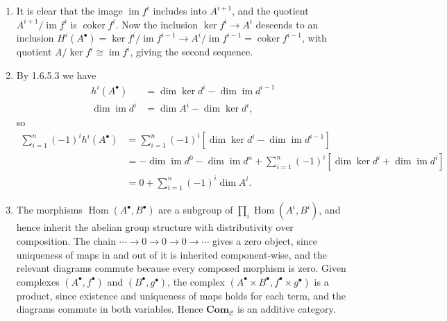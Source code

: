 \documentclass{report}
\newcommand{\cat}[1]{\mathbf{#1}} %
\newcommand{\scrC}{\mathscr{C}}
\DeclareMathOperator{\im}{im}
\DeclareMathOperator{\coker}{coker}
\DeclareMathOperator{\Hom}{Hom}
\begin{document}
\begin{enumerate}[label=\textbf{1.6.\Alph*.}]
	\item It is clear that the image $\im f^i$ includes into $A^{i+1}$, and
	      the quotient $A^{i+1}/\im f^i$ is $\coker f^i$. Now the inclusion
	      $\ker f^i\to A^i$ descends  to an inclusion
	      $H^i(A^\bullet)=\ker f^i/\im f^{i-1}\to A^i/\im f^{i-1}=\coker f^{i-1}$,
	      with quotient $A/\ker f^i\cong\im f^i$, giving the second sequence.

	\item By 1.6.5.3 we have
	      \begin{align*}
		      h^i(A^\bullet) & = \dim\ker d^i - \dim\im d^{i-1} \\
		      \dim\im d^i    & = \dim A^i - \dim\ker d^i,
	      \end{align*}
	      so
	      \begin{align*}
		      \sum_{i=1}^n(-1)^ih^i(A^\bullet)
		       & = \sum_{i=1}^n(-1)^i\left[\dim\ker d^i - \dim\im d^{i-1}\right] \\
		       & = -\dim\im d^0 - \dim\im d^n
		      + \sum_{i=1}^n(-1)^i\left[\dim\ker d^i + \dim\im d^i\right]        \\
		       & = 0 + \sum_{i=1}^n(-1)^i\dim A^i.
	      \end{align*}

	\item The morphisms $\Hom(A^\bullet,B^\bullet)$ are a subgroup of
	      $\prod_i\Hom(A^i,B^i)$, and hence inherit the abelian group structure
	      with distributivity over composition. The chain
	      $\cdots\to0\to0\to0\to\cdots$ gives a zero object, since uniqueness of
	      maps in and out of it is inherited component-wise, and the relevant
	      diagrams commute because every composed morphism is zero. Given complexes
	      $(A^\bullet,f^\bullet)$ and $(B^\bullet,g^\bullet)$, the complex
	      $(A^\bullet\times B^\bullet,f^\bullet\times g^\bullet)$ is a product,
	      since existence and uniqueness of maps holds for each term, and the
	      diagrams commute in both variables. Hence $\cat{Com}_\scrC$ is an
	      additive category.


\end{enumerate}
\end{document}
